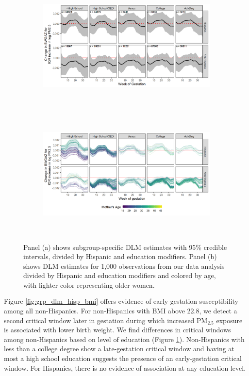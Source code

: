 \documentclass[12pt]{article}
\begin{document}
\begin{figure}[!ht]
    \begin{subfigure}{.98\textwidth}
    \centering
        \includegraphics[height=6.5cm]{img/bwgaz_grp_hisp_educ.png}
        \caption{}
        \label{fig:grp_dlm_hisp_educ}
    \end{subfigure}
    \begin{subfigure}{.98\textwidth}
    \centering
        \includegraphics[height=6.5cm]{img/bwgaz_hisp_educ_age.png}
        \caption{}
        \label{fig:ind_dlm_hisp_educ}
    \end{subfigure}
    \caption{Panel (a) shows subgroup-specific DLM estimates with 95\% credible intervals, divided by Hispanic and education modifiers. Panel (b) shows DLM estimates for 1,000 observations from our data analysis divided by Hispanic and education modifiers and colored by age, with lighter color representing older women.}
\end{figure}

Figure \ref{fig:grp_dlm_hisp_bmi} offers evidence of early-gestation susceptibility among all non-Hispanics. For non-Hispanics with BMI above 22.8, we detect a second critical window later in gestation during which increased PM$_{2.5}$ exposure is associated with lower birth weight. We find differences in critical windows among non-Hispanics based on level of education (Figure \ref{fig:grp_dlm_hisp_educ}). Non-Hispanics with less than a college degree show a late-gestation critical window and having at most a high school education suggests the presence of an early-gestation critical window. For Hispanics, there is no evidence of association at any education level. 
\end{document}
